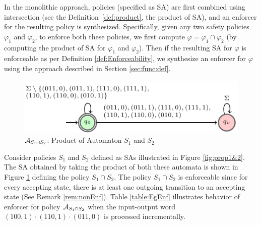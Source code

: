 In the monolithic approach, policies (specified as SA) are first combined using intersection (see the Definition~\ref{def:product}, the product of SA), and an enforcer for the resulting policy is synthesized. Specifically, given any two
safety policies $\varphi_1$ and $\varphi_2$, to enforce both these policies, we first compute $\varphi =
\varphi_1 \cap \varphi_2$ (by computing the product of SA for $\varphi_1$ and $\varphi_2$). Then if the resulting SA for $\varphi$ is enforceable as per Definition \ref{def:Enforceability}, we synthesize
an enforcer for $\varphi$ using the approach described in Section \ref{sec:func:def}. 

\begin{figure}[htb]
	\centering
	\includegraphics[scale=1]{fig/sa1sa2-crop2.pdf}
	\caption{${\cal A}_{S_1\cap S_2}$: Product of Automaton $S_1$ and $S_2$}
	\label{fig:prod}
\end{figure}

\begin{example}
	Consider policies $S_1$ and $S_2$ defined as SAs illustrated in Figure \ref{fig:prop1&2}.
	The SA obtained by taking the product of both these automata is shown in Figure \ref{fig:prod} defining the policy $S_1 \cap S_2$.
	The policy $S_1 \cap S_2$ is enforceable since for every accepting state, there is at least one outgoing transition to an accepting state (See Remark \ref{rem:nonEnf}). Table \ref{table:EgEnf} illustrates behavior of enforcer for policy ${\cal A}_{S_1 \cap S_2}$ when the input-output word $(100,1)\cdot(110,1)\cdot(011,0)$ is processed incrementally.
\end{example}	

